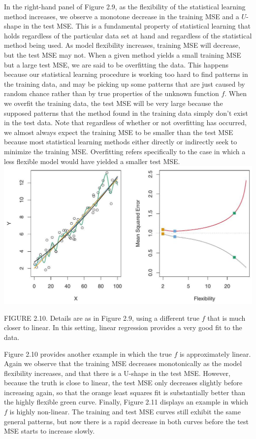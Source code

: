 \documentclass[10pt]{article}
\begin{document}
In the right-hand panel of Figure 2.9, as the flexibility of the statistical learning method increases, we observe a monotone decrease in the training MSE and a $U$-shape in the test MSE. This is a fundamental property of statistical learning that holds regardless of the particular data set at hand and regardless of the statistical method being used. As model flexibility increases, training MSE will decrease, but the test MSE may not. When a given method yields a small training MSE but a large test MSE, we are said to be overfitting the data. This happens because our statistical learning procedure is working too hard to find patterns in the training data, and may be picking up some patterns that are just caused by random chance rather than by true properties of the unknown function $f$. When we overfit the training data, the test MSE will be very large because the supposed patterns that the method found in the training data simply don't exist in the test data. Note that regardless of whether or not overfitting has occurred, we almost always expect the training MSE to be smaller than the test MSE because most statistical learning methods either directly or indirectly seek to minimize the training MSE. Overfitting refers specifically to the case in which a less flexible model would have yielded a smaller test MSE.\\
\includegraphics[max width=\textwidth, center]{2025_05_05_efe77898333945044de4g-048}

FIGURE 2.10. Details are as in Figure 2.9, using a different true $f$ that is much closer to linear. In this setting, linear regression provides a very good fit to the data.

Figure 2.10 provides another example in which the true $f$ is approximately linear. Again we observe that the training MSE decreases monotonically as the model flexibility increases, and that there is a U-shape in the test MSE. However, because the truth is close to linear, the test MSE only decreases slightly before increasing again, so that the orange least squares fit is substantially better than the highly flexible green curve. Finally, Figure 2.11 displays an example in which $f$ is highly non-linear. The training and test MSE curves still exhibit the same general patterns, but now there is a rapid decrease in both curves before the test MSE starts to increase slowly.
\end{document}
